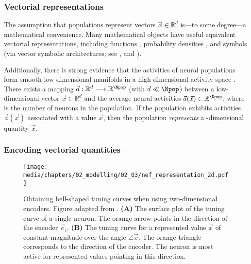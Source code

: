 \subsubsection{Vectorial representations}
The assumption that populations represent vectors $\vec x \in \mathbb{R}^d$ is---to some degree---a mathematical convenience.
Many mathematical objects have useful equivalent vectorial representations, including functions \citep[Chapter 3]{eliasmith2003neural}, probability densities \citep[Chapter 9]{eliasmith2003neural}, and symbols (via vector symbolic architectures; see \cite{gayler2003vector}, \cite{eliasmith2012largescale} and \cite{eliasmith2013how}).

Additionally, there is strong evidence that the activities of neural populations form smooth low-dimensional manifolds in a high-dimensional activity space \citep{gallego2017neural,stringer2019highdimensional}.
There exists a mapping $\vec a: \mathbb{R}^d \longrightarrow \mathbb{R}^{\Npop}$ (with $d \ll \Npop$) between a low-dimensional vector $\vec x \in \mathbb{R}^d$ and the average neural activities $\vec a(\vec x) \in \mathbb{R}^{\Npop}$, where \Npop is the number of neurons in the population.
If the population exhibits activities $\vec a(\vec x)$ associated with a value $\vec x$, then the population \emph{represents} a \Ndim-dimensional quantity $\vec x$.

\subsubsection{Encoding vectorial quantities}

\begin{figure}
	\centering
	\texttt{[image: media/chapters/02\_modelling/02\_03/nef\_representation\_2d.pdf]}
	{\label{fig:nef_representation_2d_surface}}
	{\label{fig:nef_representation_2d_unit_circle}}
	\caption[Obtaining bell-shaped tuning curves when using two-dimensional encoders]{Obtaining bell-shaped tuning curves when using two-dimensional encoders. Figure adapted from \citet[Figure~2.8, p.~52]{eliasmith2003neural}.
	\textbf{(A)} The surface plot of the tuning curve of a single neuron. The orange arrow points in the direction of the encoder $\vec e_i$.
	\textbf{(B)} The tuning curve for a represented value $\vec x$ of constant magnitude over the angle $\angle \vec x$.
	The orange triangle corresponds to the direction of the encoder.
	The neuron is most active for represented values pointing in this direction.
	}
	\label{fig:nef_representation_2d}
\end{figure}

